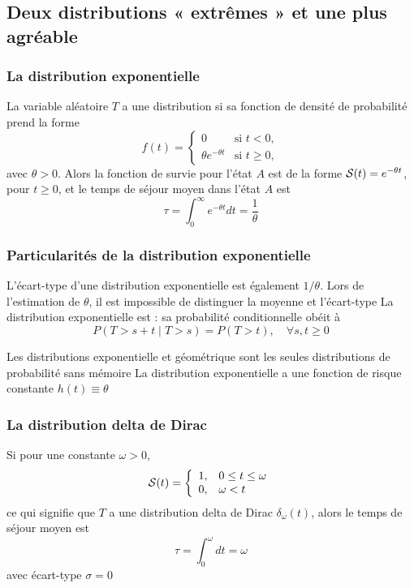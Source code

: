 \documentclass[aspectratio=169]{beamer}\usepackage[]{graphicx}\usepackage[]{xcolor}
\begin{document}
\subsection{Deux distributions « extrêmes » et une plus agréable}

\begin{frame}\frametitle{La distribution exponentielle}
La variable aléatoire $T$ a une distribution  si sa
fonction de densité de probabilité prend la forme
\begin{equation}\label{eq:exp_distrib}
f(t)=\begin{cases}0&\textrm{si }t<0,\\
\theta e^{-\theta t}&\textrm{si }t\geq 0,
\end{cases}
\end{equation}
avec $\theta>0$. Alors la
fonction de survie pour l'état $A$ est de la forme $\S(t)=e^{-\theta
  t}$, pour $t\geq 0$, et le temps de séjour moyen dans l'état $A$ est
\[
\tau=\int_0^\infty e^{-\theta t}dt=\frac 1\theta
\]
\end{frame}

\begin{frame}\frametitle{Particularités de la distribution exponentielle}
L'écart-type d'une distribution exponentielle est également $1/\theta$. Lors de l'estimation de $\theta$, il est impossible de distinguer la moyenne et l'écart-type
\vfill
La distribution exponentielle est  : sa probabilité conditionnelle obéit à
\[
P(T > s + t\; |\; T > s) = P(T > t),\quad\forall s, t \ge 0
\]

Les distributions exponentielle et géométrique sont les seules distributions de probabilité sans mémoire
\vfill
La distribution exponentielle a une fonction de risque constante $h(t)\equiv\theta$
\end{frame}




\begin{frame}\frametitle{La distribution delta de Dirac}
Si pour une constante $\omega>0$,
\[
\S(t)=
\left\{
\begin{array}{ll}
1, & 0\leq t\leq\omega \\
0, & \omega<t
\end{array}
\right.
\]
ce qui signifie que $T$ a une distribution delta de Dirac
$\delta_\omega(t)$, alors le temps de séjour moyen est
\[
\tau=\int_0^\omega dt=\omega
\]
avec écart-type $\sigma=0$
\end{frame}
\end{document}
